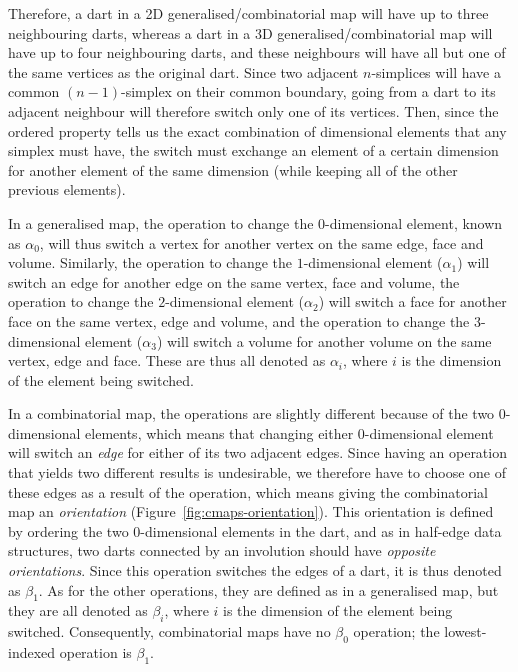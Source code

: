 Therefore, a dart in a 2D generalised/combinatorial map will have up to three neighbouring darts, whereas a dart in a 3D generalised/combinatorial map will have up to four neighbouring darts, and these neighbours will have all but one of the same vertices as the original dart.
Since two adjacent \(n\)-simplices will have a common \((n-1)\)-simplex on their common boundary, going from a dart to its adjacent neighbour will therefore switch only one of its vertices.
Then, since the ordered property tells us the exact combination of dimensional elements that any simplex must have, the switch must exchange an element of a certain dimension for another element of the same dimension (while keeping all of the other previous elements).

In a generalised map, the operation to change the \(0\)-dimensional element, known as \(\alpha_0\), will thus switch a vertex for another vertex on the same edge, face and volume.
Similarly, the operation to change the \(1\)-dimensional element (\(\alpha_1\)) will switch an edge for another edge on the same vertex, face and volume, the operation to change the \(2\)-dimensional element (\(\alpha_2\)) will switch a face for another face on the same vertex, edge and volume, and the operation to change the \(3\)-dimensional element (\(\alpha_3\)) will switch a volume for another volume on the same vertex, edge and face.
These are thus all denoted as \(\alpha_i\)\marginnote{\(\alpha\)}\index{\(\alpha\)}, where \(i\) is the dimension of the element being switched.

In a combinatorial map, the operations are slightly different because of the two \(0\)-dimensional elements, which means that changing either \(0\)-dimensional element will switch an \emph{edge} for either of its two adjacent edges.
Since having an operation that yields two different results is undesirable, we therefore have to choose one of these edges as a result of the operation, which means giving the combinatorial map an \emph{orientation} (Figure~\ref{fig:cmaps-orientation}).
This orientation is defined by ordering the two \(0\)-dimensional elements in the dart, and as in half-edge data structures, two darts connected by an involution should have \emph{opposite orientations}.
Since this operation switches the edges of a dart, it is thus denoted as \(\beta_1\).
As for the other operations, they are defined as in a generalised map, but they are all denoted as \(\beta_i\)\marginnote{\(\beta\)}\index{\(\beta\)}, where \(i\) is the dimension of the element being switched.
Consequently, combinatorial maps have no \(\beta_0\) operation; the lowest-indexed operation is \(\beta_1\).

